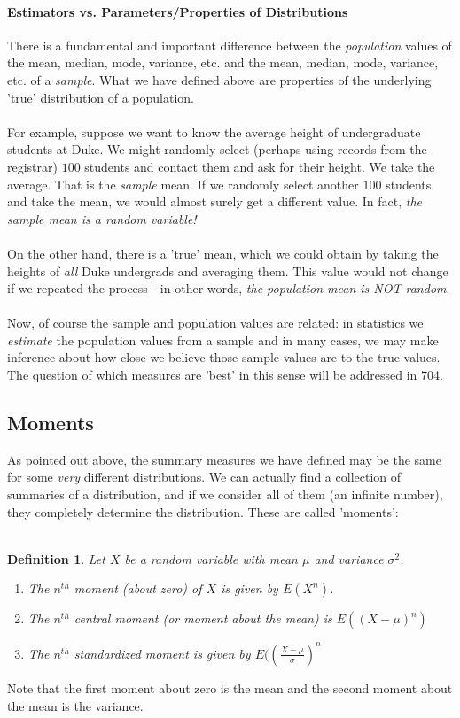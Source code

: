 \documentclass[12pt]{article} %
\newtheorem{defn}{Definition}
\begin{document}
\paragraph{Estimators vs. Parameters/Properties of Distributions}
There is a fundamental and important difference between the \emph{population} values of the mean, median, mode, variance, etc. and the mean, median, mode, variance, etc. of a \emph{sample}. What we have defined above are properties of the underlying 'true' distribution of a population. \\\\
For example, suppose we want to know the average height of undergraduate students at Duke. We might randomly select (perhaps using records from the registrar) $100$ students and contact them and ask for their height. We take the average. That is the \emph{sample} mean. If we randomly select another $100$ students and take the mean, we would almost surely get a different value. In fact, \emph{the sample mean is a random variable!} \\\\
On the other hand, there is a 'true' mean, which we could obtain by taking the heights of \emph{all} Duke undergrads and averaging them. This value would not change if we repeated the process - in other words, \emph{the population mean is NOT random}.\\\\
Now, of course the sample and population values are related: in statistics we \emph{estimate} the population values from a sample and in many cases, we may make inference about how close we believe those sample values are to the true values. The question of which measures are 'best' in this sense will be addressed in 704.
\subsection{Moments}
As pointed out above, the summary measures we have defined may be the same for some \emph{very} different distributions. We can actually find a collection of summaries of a distribution, and if we consider all of them (an infinite number), they completely determine the distribution. These are called 'moments':\\\\
\begin{defn}
Let $X$ be a random variable with mean $\mu$ and variance $\sigma^2$. 
\begin{enumerate}
\item The $n^{th}$ moment (about zero) of $X$ is given by $E(X^n)$.
\item The $n^{th}$ central moment (or moment about the mean) is $E((X-\mu)^n)$
\item The $n^{th}$ standardized moment is given by $E(\left(\frac{X-\mu}{\sigma}\right)^n$
\end{enumerate}
\end{defn} 

Note that the first moment about zero is the mean and the second moment about the mean is the variance.
\end{document}
